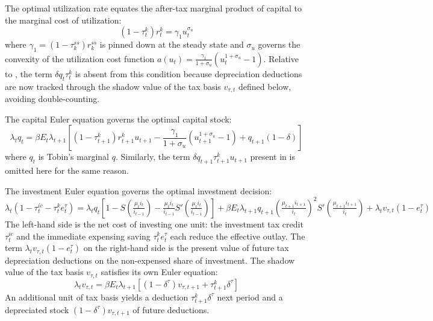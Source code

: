 \documentclass[article,11pt,letterpaper,fleqn]{article}
\theoremstyle{definition}
\numberwithin{equation}{section}
\begin{document}
The optimal utilization rate equates the after-tax marginal product of capital to the marginal cost of utilization:
\begin{equation}\label{eq:util}
(1-\tau_{t}^{k})r_{t}^{k} = \gamma_1 u_{t}^{\sigma_u}
\end{equation}
where $\gamma_1 = (1-\tau_k^{ss})r_k^{ss}$ is pinned down at the steady state and $\sigma_u$ governs the convexity of the utilization cost function $a(u_t) = \frac{\gamma_1}{1+\sigma_u}(u_t^{1+\sigma_u}-1)$. Relative to \citet{Zubairy2014}, the term $\delta q_t \tau_t^k$ is absent from this condition because depreciation deductions are now tracked through the shadow value of the tax basis $v_{\tau,t}$ defined below, avoiding double-counting.

The capital Euler equation governs the optimal capital stock:
\begin{equation}\label{eq:capeuler}
\lambda_t q_t = \beta E_t \lambda_{t+1} \left[(1-\tau_{t+1}^{k})r_{t+1}^{k}u_{t+1} - \frac{\gamma_1}{1+\sigma_u}\!\left(u_{t+1}^{1+\sigma_u}-1\right) + q_{t+1}(1-\delta)\right]
\end{equation}
where $q_t$ is Tobin's marginal $q$. Similarly, the term $\delta q_{t+1}\tau_{t+1}^k u_{t+1}$ present in \citet{Zubairy2014} is omitted here for the same reason.

The investment Euler equation governs the optimal investment decision:
\begin{equation}\label{eq:inv}
\lambda_t\!\left(1-\tau_{t}^{ic}-\tau_{t}^{k}e_{t}^{\tau}\right) = \lambda_t q_t \!\left[1-S\!\left(\tfrac{\mu_t i_t}{i_{t-1}}\right) - \tfrac{\mu_t i_t}{i_{t-1}} S'\!\left(\tfrac{\mu_t i_t}{i_{t-1}}\right)\right] + \beta E_t \lambda_{t+1} q_{t+1} \!\left(\tfrac{\mu_{t+1}i_{t+1}}{i_t}\right)^{\!2} S'\!\left(\tfrac{\mu_{t+1}i_{t+1}}{i_t}\right) + \lambda_t v_{\tau,t}(1-e_{t}^{\tau})
\end{equation}
The left-hand side is the net cost of investing one unit: the investment tax credit $\tau_t^{ic}$ and the immediate expensing saving $\tau_t^k e_t^{\tau}$ each reduce the effective outlay. The term $\lambda_t v_{\tau,t}(1-e_t^{\tau})$ on the right-hand side is the present value of future tax depreciation deductions on the non-expensed share of investment. The shadow value of the tax basis $v_{\tau,t}$ satisfies its own Euler equation:
\begin{equation}\label{eq:vtau}
\lambda_t v_{\tau,t} = \beta E_t \lambda_{t+1}\!\left[(1-\delta^{\tau})v_{\tau,t+1} + \tau_{t+1}^{k}\delta^{\tau}\right]
\end{equation}
An additional unit of tax basis yields a deduction $\tau_{t+1}^k\delta^{\tau}$ next period and a depreciated stock $(1-\delta^{\tau})v_{\tau,t+1}$ of future deductions.
\end{document}
